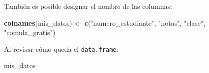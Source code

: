 \documentclass[
]{article}
\newenvironment{Shaded}{\begin{snugshade}}{\end{snugshade}}
\newcommand{\FunctionTok}[1]{\textcolor[rgb]{0.13,0.29,0.53}{\textbf{#1}}}
\newcommand{\NormalTok}[1]{#1}
\newcommand{\OtherTok}[1]{\textcolor[rgb]{0.56,0.35,0.01}{#1}}
\newcommand{\StringTok}[1]{\textcolor[rgb]{0.31,0.60,0.02}{#1}}
\begin{document}
También es posible designar el nombre de las columnas:

\begin{Shaded}
\begin{Highlighting}[]
\FunctionTok{colnames}\NormalTok{(mis\_datos) }\OtherTok{\textless{}{-}} \FunctionTok{c}\NormalTok{(}\StringTok{"numero\_estudiante"}\NormalTok{, }\StringTok{"notas"}\NormalTok{, }\StringTok{"clase"}\NormalTok{, }\StringTok{"comida\_gratis"}\NormalTok{)}
\end{Highlighting}
\end{Shaded}

Al revisar cómo queda el \texttt{data.frame}:

\begin{Shaded}
\begin{Highlighting}[]
\NormalTok{mis\_datos}
\end{Highlighting}
\end{Shaded}

 
  \providecommand{\huxb}[2]{\arrayrulecolor[RGB]{#1}\global\arrayrulewidth=#2pt}
  \providecommand{\huxvb}[2]{\color[RGB]{#1}\vrule width #2pt}
  \providecommand{\huxtpad}[1]{\rule{0pt}{#1}}
  \providecommand{\huxbpad}[1]{\rule[-#1]{0pt}{#1}}
\end{document}
